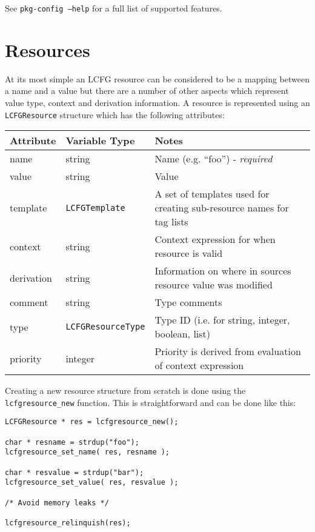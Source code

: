 \documentclass[11pt,a4paper,titlepage]{article}
\begin{document}
See \texttt{pkg-config --help} for a full list of supported features.

\section{Resources}

At its most simple an LCFG resource can be considered to be a mapping
between a name and a value but there are a number of other aspects
which represent value type, context and derivation information. A
resource is represented using an \texttt{LCFGResource} structure which
has the following attributes:

\begin{center}
  \begin{tabular}{| l l p{7cm}|}
\hline
Attribute  & Variable Type & Notes \\ 
\hline
name       & string & Name (e.g. ``foo'') - \textit{required}\\
value      & string & Value \\
template   & \texttt{LCFGTemplate} & A set of templates used for creating sub-resource names for tag lists \\
context    & string & Context expression for when resource is valid \\
derivation & string & Information on where in sources resource value was modified \\
comment    & string & Type comments \\
type       & \texttt{LCFGResourceType} & Type ID (i.e. for string, integer, boolean, list) \\
priority   & integer & Priority is derived from evaluation of context expression \\
\hline
\end{tabular}
\end{center}

Creating a new resource structure from scratch is done using the
\texttt{lcfgresource\_new} function. This is straightforward and can
be done like this:

\begin{verbatim}
LCFGResource * res = lcfgresource_new();

char * resname = strdup("foo");
lcfgresource_set_name( res, resname );

char * resvalue = strdup("bar");
lcfgresource_set_value( res, resvalue );

/* Avoid memory leaks */

lcfgresource_relinquish(res);
\end{verbatim}
\end{document}
